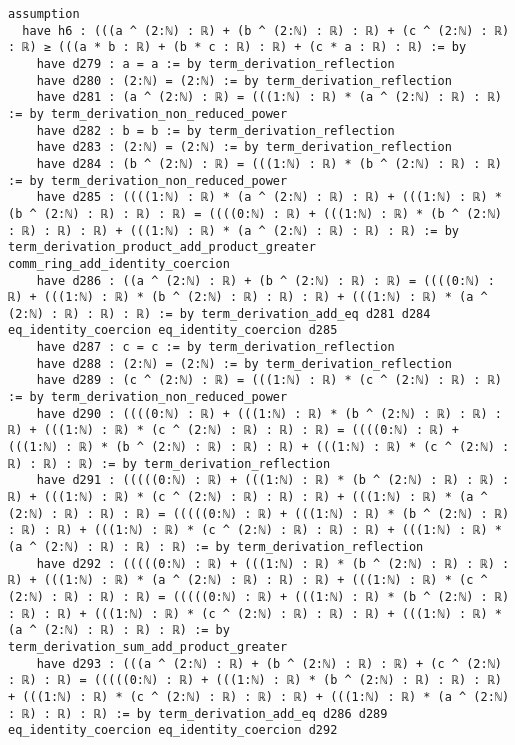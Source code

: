 \documentclass{article}
\begin{document}
\begin{tcolorbox}[colback=white!10, width=\linewidth]
\begin{lstlisting}[language=Lean4]
    assumption
  have h6 : (((a ^ (2:ℕ) : ℝ) + (b ^ (2:ℕ) : ℝ) : ℝ) + (c ^ (2:ℕ) : ℝ) : ℝ) ≥ (((a * b : ℝ) + (b * c : ℝ) : ℝ) + (c * a : ℝ) : ℝ) := by
    have d279 : a = a := by term_derivation_reflection
    have d280 : (2:ℕ) = (2:ℕ) := by term_derivation_reflection
    have d281 : (a ^ (2:ℕ) : ℝ) = (((1:ℕ) : ℝ) * (a ^ (2:ℕ) : ℝ) : ℝ) := by term_derivation_non_reduced_power
    have d282 : b = b := by term_derivation_reflection
    have d283 : (2:ℕ) = (2:ℕ) := by term_derivation_reflection
    have d284 : (b ^ (2:ℕ) : ℝ) = (((1:ℕ) : ℝ) * (b ^ (2:ℕ) : ℝ) : ℝ) := by term_derivation_non_reduced_power
    have d285 : ((((1:ℕ) : ℝ) * (a ^ (2:ℕ) : ℝ) : ℝ) + (((1:ℕ) : ℝ) * (b ^ (2:ℕ) : ℝ) : ℝ) : ℝ) = ((((0:ℕ) : ℝ) + (((1:ℕ) : ℝ) * (b ^ (2:ℕ) : ℝ) : ℝ) : ℝ) + (((1:ℕ) : ℝ) * (a ^ (2:ℕ) : ℝ) : ℝ) : ℝ) := by term_derivation_product_add_product_greater comm_ring_add_identity_coercion
    have d286 : ((a ^ (2:ℕ) : ℝ) + (b ^ (2:ℕ) : ℝ) : ℝ) = ((((0:ℕ) : ℝ) + (((1:ℕ) : ℝ) * (b ^ (2:ℕ) : ℝ) : ℝ) : ℝ) + (((1:ℕ) : ℝ) * (a ^ (2:ℕ) : ℝ) : ℝ) : ℝ) := by term_derivation_add_eq d281 d284 eq_identity_coercion eq_identity_coercion d285
    have d287 : c = c := by term_derivation_reflection
    have d288 : (2:ℕ) = (2:ℕ) := by term_derivation_reflection
    have d289 : (c ^ (2:ℕ) : ℝ) = (((1:ℕ) : ℝ) * (c ^ (2:ℕ) : ℝ) : ℝ) := by term_derivation_non_reduced_power
    have d290 : ((((0:ℕ) : ℝ) + (((1:ℕ) : ℝ) * (b ^ (2:ℕ) : ℝ) : ℝ) : ℝ) + (((1:ℕ) : ℝ) * (c ^ (2:ℕ) : ℝ) : ℝ) : ℝ) = ((((0:ℕ) : ℝ) + (((1:ℕ) : ℝ) * (b ^ (2:ℕ) : ℝ) : ℝ) : ℝ) + (((1:ℕ) : ℝ) * (c ^ (2:ℕ) : ℝ) : ℝ) : ℝ) := by term_derivation_reflection
    have d291 : (((((0:ℕ) : ℝ) + (((1:ℕ) : ℝ) * (b ^ (2:ℕ) : ℝ) : ℝ) : ℝ) + (((1:ℕ) : ℝ) * (c ^ (2:ℕ) : ℝ) : ℝ) : ℝ) + (((1:ℕ) : ℝ) * (a ^ (2:ℕ) : ℝ) : ℝ) : ℝ) = (((((0:ℕ) : ℝ) + (((1:ℕ) : ℝ) * (b ^ (2:ℕ) : ℝ) : ℝ) : ℝ) + (((1:ℕ) : ℝ) * (c ^ (2:ℕ) : ℝ) : ℝ) : ℝ) + (((1:ℕ) : ℝ) * (a ^ (2:ℕ) : ℝ) : ℝ) : ℝ) := by term_derivation_reflection
    have d292 : (((((0:ℕ) : ℝ) + (((1:ℕ) : ℝ) * (b ^ (2:ℕ) : ℝ) : ℝ) : ℝ) + (((1:ℕ) : ℝ) * (a ^ (2:ℕ) : ℝ) : ℝ) : ℝ) + (((1:ℕ) : ℝ) * (c ^ (2:ℕ) : ℝ) : ℝ) : ℝ) = (((((0:ℕ) : ℝ) + (((1:ℕ) : ℝ) * (b ^ (2:ℕ) : ℝ) : ℝ) : ℝ) + (((1:ℕ) : ℝ) * (c ^ (2:ℕ) : ℝ) : ℝ) : ℝ) + (((1:ℕ) : ℝ) * (a ^ (2:ℕ) : ℝ) : ℝ) : ℝ) := by term_derivation_sum_add_product_greater
    have d293 : (((a ^ (2:ℕ) : ℝ) + (b ^ (2:ℕ) : ℝ) : ℝ) + (c ^ (2:ℕ) : ℝ) : ℝ) = (((((0:ℕ) : ℝ) + (((1:ℕ) : ℝ) * (b ^ (2:ℕ) : ℝ) : ℝ) : ℝ) + (((1:ℕ) : ℝ) * (c ^ (2:ℕ) : ℝ) : ℝ) : ℝ) + (((1:ℕ) : ℝ) * (a ^ (2:ℕ) : ℝ) : ℝ) : ℝ) := by term_derivation_add_eq d286 d289 eq_identity_coercion eq_identity_coercion d292

\end{lstlisting}
\end{tcolorbox}
\end{document}
